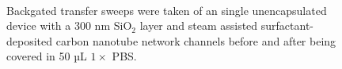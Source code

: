 \documentclass[
  letterpaper,
  DIV=11,
  numbers=noendperiod]{scrartcl}
\begin{document}
\begin{figure}
\begin{minipage}[t]{0.01\linewidth}
{\centering 

~

}

\end{minipage}%

\caption{\label{fig-buffer-effect-on-backgate}Backgated transfer sweeps
were taken of an single unencapsulated device with a 300 nm SiO\(_2\)
layer and steam assisted surfactant-deposited carbon nanotube network
channels before and after being covered in 50 µL \(1 \times\) PBS.}

\end{figure}

\begin{figure}

\begin{minipage}[t]{0.03\linewidth}

{\centering 


}

\end{minipage}%
%
\begin{minipage}[t]{0.01\linewidth}

{\centering 

~

}

\end{minipage}%
%
\begin{minipage}[t]{0.45\linewidth}

{\centering 

\raisebox{-\height}{

}}
\end{minipage}
\end{figure}
\end{document}
